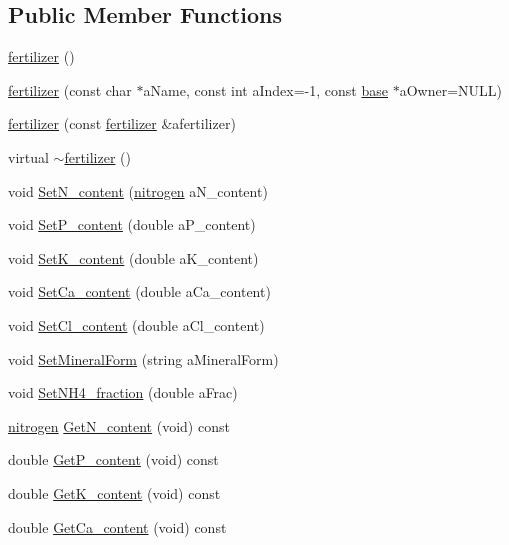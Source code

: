 \subsection*{Public Member Functions}
\begin{DoxyCompactItemize}
\item 
\hyperlink{classfertilizer_a1e4d38a4e98f1a0b39f1852de0d30383}{fertilizer} ()
\item 
\hyperlink{classfertilizer_adc4ae0decca7ec895def3a670f59c597}{fertilizer} (const char $\ast$aName, const int aIndex=-\/1, const \hyperlink{classbase}{base} $\ast$aOwner=NULL)
\item 
\hyperlink{classfertilizer_ac7b4304100a388cedaad65c9eeaec128}{fertilizer} (const \hyperlink{classfertilizer}{fertilizer} \&afertilizer)
\item 
virtual \hyperlink{classfertilizer_acbb1a09db1bcb0818f3aaafd9cd0a7ea}{$\sim$fertilizer} ()
\item 
void \hyperlink{classfertilizer_a213ec34de1c23058796926ea2a5eb724}{SetN\_\-content} (\hyperlink{classnitrogen}{nitrogen} aN\_\-content)
\item 
void \hyperlink{classfertilizer_accf91762ffa698a82bcd2579e13d8ac2}{SetP\_\-content} (double aP\_\-content)
\item 
void \hyperlink{classfertilizer_aba04153f1ef7cd9d8415fd7e75511ea9}{SetK\_\-content} (double aK\_\-content)
\item 
void \hyperlink{classfertilizer_a63ac67ef24e6587f37a0c54a89c2afb4}{SetCa\_\-content} (double aCa\_\-content)
\item 
void \hyperlink{classfertilizer_a1aa5f7fc62508c6af74293e912ca2207}{SetCl\_\-content} (double aCl\_\-content)
\item 
void \hyperlink{classfertilizer_af4bd988ce3875432ddc2014a21476444}{SetMineralForm} (string aMineralForm)
\item 
void \hyperlink{classfertilizer_a532d27ade401ee2ee620a6d1fe63f4e7}{SetNH4\_\-fraction} (double aFrac)
\item 
\hyperlink{classnitrogen}{nitrogen} \hyperlink{classfertilizer_a1b638345af84d6574dd4f9c5524bafc6}{GetN\_\-content} (void) const 
\item 
double \hyperlink{classfertilizer_aae9eb1ab9df9f6fe92529a2f7d0e7f55}{GetP\_\-content} (void) const 
\item 
double \hyperlink{classfertilizer_a72ac8ceb98ce846dbfc1b7d1d404e9c3}{GetK\_\-content} (void) const 
\item 
double \hyperlink{classfertilizer_ae3ddec9d6c7c27d2d3174cc7cb8a2703}{GetCa\_\-content} (void) const 

\end{DoxyCompactItemize}
